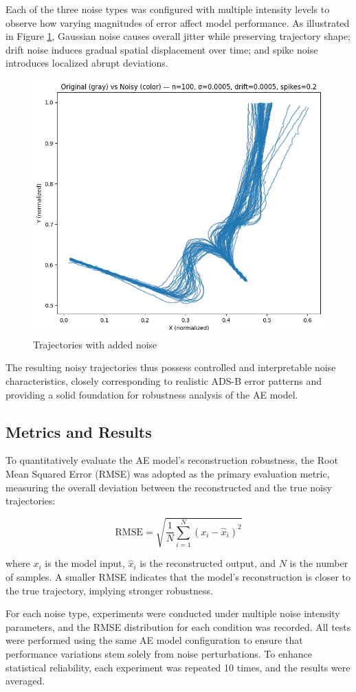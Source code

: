 Each of the three noise types was configured with multiple intensity levels to observe how varying magnitudes of error affect model performance. As illustrated in Figure \ref{fig:noisy-tracks}, Gaussian noise causes overall jitter while preserving trajectory shape; drift noise induces gradual spatial displacement over time; and spike noise introduces localized abrupt deviations.
\begin{figure}
	\centering
	\includegraphics[width=0.5\linewidth]{"noisy tracks"}
	\caption{Trajectories with added noise}
	\label{fig:noisy-tracks}
\end{figure}

The resulting noisy trajectories thus possess controlled and interpretable noise characteristics, closely corresponding to realistic ADS-B error patterns and providing a solid foundation for robustness analysis of the AE model.

\subsection{Metrics and Results}
To quantitatively evaluate the AE model’s reconstruction robustness, the Root Mean Squared Error (RMSE) was adopted as the primary evaluation metric, measuring the overall deviation between the reconstructed and the true noisy trajectories:

\[
\mathrm{RMSE} = \sqrt{\frac{1}{N} \sum_{i=1}^{N} \left( x_i - \hat{x}_i \right)^2}
\]

where \( x_i \) is the model input, \( \hat{x}_i \) is the reconstructed output, and \( N \) is the number of samples. A smaller RMSE indicates that the model's reconstruction is closer to the true trajectory, implying stronger robustness.

For each noise type, experiments were conducted under multiple noise intensity parameters, and the RMSE distribution for each condition was recorded. All tests were performed using the same AE model configuration to ensure that performance variations stem solely from noise perturbations. To enhance statistical reliability, each experiment was repeated 10 times, and the results were averaged.

